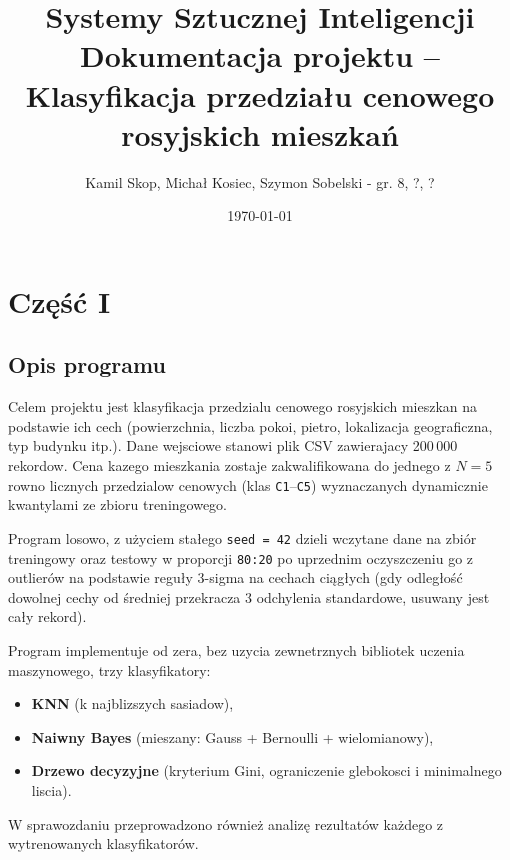 \documentclass[12pt,a4paper]{article}
\begin{document}
	
	\title{Systemy Sztucznej Inteligencji\\
	\small{Dokumentacja projektu -- Klasyfikacja przedziału cenowego rosyjskich mieszkań}}
	\author{Kamil Skop, Michał Kosiec, Szymon Sobelski - gr. 8, ?, ?}
	\date{\today}

	\maketitle
	\tableofcontents
	\newpage

	\section{Część I}

	\subsection{Opis programu}

	Celem projektu jest klasyfikacja przedzialu cenowego rosyjskich mieszkan na podstawie ich cech
	(powierzchnia, liczba pokoi, pietro, lokalizacja geograficzna, typ budynku itp.).
	Dane wejsciowe stanowi plik CSV zawierajacy 200\,000 rekordow.
	Cena kazego mieszkania zostaje zakwalifikowana do jednego z $N = 5$ rowno licznych przedzialow cenowych
	(klas \texttt{C1}--\texttt{C5}) wyznaczanych dynamicznie kwantylami ze zbioru treningowego.
	
	Program losowo, z użyciem stałego \texttt{seed = 42} dzieli wczytane dane na zbiór treningowy oraz testowy w proporcji \texttt{80:20} po uprzednim oczyszczeniu go z outlierów na podstawie reguły 3-sigma na cechach ciągłych (gdy odległość dowolnej cechy od średniej przekracza 3 odchylenia standardowe, usuwany jest cały rekord).

	Program implementuje od zera, bez uzycia zewnetrznych bibliotek uczenia maszynowego,
	trzy klasyfikatory:
	\begin{itemize}
		\item \textbf{KNN} (k najblizszych sasiadow),
		\item \textbf{Naiwny Bayes} (mieszany: Gauss + Bernoulli + wielomianowy),
		\item \textbf{Drzewo decyzyjne} (kryterium Gini, ograniczenie glebokosci i minimalnego liscia).
	\end{itemize}
	
	W sprawozdaniu przeprowadzono również analizę rezultatów każdego z wytrenowanych klasyfikatorów.
	
\end{document}
